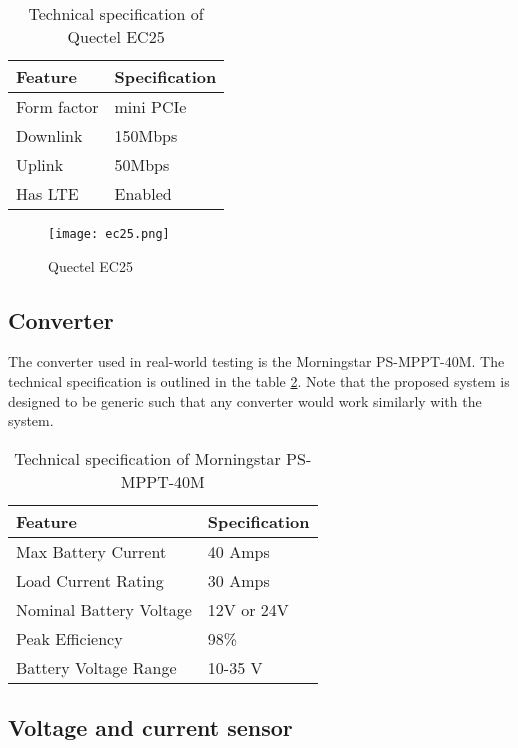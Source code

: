 \documentclass[../thesis.tex]{subfiles}
\begin{document}
\begin{table}[h!]
\begin{center}
\caption{Technical specification of Quectel EC25}
\label{tab:quectelEC25}
\begin{tabular}{l|l}
\toprule
\textbf{Feature} & \textbf{Specification}\\
\midrule
Form factor & mini PCIe\\
Downlink & 150Mbps\\
Uplink & 50Mbps\\
Has LTE & Enabled\\
\bottomrule
\end{tabular}
\end{center}
\end{table}

\begin{figure}[!ht]
\centering
\texttt{[image: ec25.png]}
\caption{Quectel EC25 \cite{Quectel}}
\label{fig:quectelEC25}
\end{figure}

\subsection{Converter}

The converter used in real-world testing is the Morningstar PS-MPPT-40M. The technical specification is outlined in the table \ref{tab:psmppt40m}. Note that the proposed system is designed to be generic such that any converter would work similarly with the system.

\begin{table}[h!]
\begin{center}
\caption{Technical specification of Morningstar PS-MPPT-40M}
\label{tab:psmppt40m}
\begin{tabular}{l|l}
\toprule
\textbf{Feature} & \textbf{Specification}\\
\midrule
Max Battery Current & 40 Amps\\
Load Current Rating & 30 Amps\\
Nominal Battery Voltage & 12V or 24V\\
Peak Efficiency & 98\%\\
Battery Voltage Range & 10-35 V\\
\bottomrule
\end{tabular}
\end{center}
\end{table}


\subsection{Voltage and current sensor}
\end{document}
